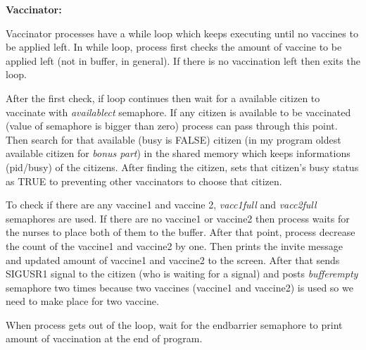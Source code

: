 \documentclass[12pt]{report}
\renewcommand{\_}{\kern-1.5pt\textunderscore\kern-1.5pt}
\begin{document}
\vspace{\baselineskip}
\begin{FlushLeft}
{\fontsize{14pt}{16.8pt}\selectfont \textbf{Vaccinator:}} 
\end{FlushLeft}
\begin{FlushLeft}
Vaccinator processes have a while loop which keeps executing until no vaccines to be applied left. In while loop, process first checks the amount of vaccine to be applied left (not in buffer, in general). If there is no vaccination left then exits the loop. 
\end{FlushLeft}
\begin{FlushLeft}
After the first check, if loop continues then wait for a available citizen to vaccinate with \textit{available\_ct }semaphore. If any citizen is available to be vaccinated (value of semaphore is bigger than zero) process can pass through this point. Then search for that available (busy is FALSE) citizen (in my program oldest available citizen for \textit{bonus part}) in the shared memory which keeps informations (pid/busy) of the citizens. After finding the citizen, sets that citizen’s busy status as TRUE to preventing other vaccinators to choose that citizen.
\end{FlushLeft}
\begin{FlushLeft}
To check if there are any vaccine1 and vaccine 2, \textit{vacc1\_full} and \textit{vacc2\_full} semaphores are used. If there are no vaccine1 or vaccine2 then process waits for the nurses to place both of them to the buffer. After that point, process decrease the count of the vaccine1 and vaccine2 by one. Then prints the invite message and updated amount of vaccine1 and vaccine2 to the screen. After that sends SIGUSR1 signal to the citizen (who is waiting for a signal) and posts\textit{ buffer\_empty} semaphore two times because two vaccines (vaccine1 and vaccine2) is used so we need to make place for two vaccine.
\end{FlushLeft}
\begin{FlushLeft}
When process gets out of the loop, wait for the end\_barrier semaphore to print amount of vaccination at the end of program.
\end{FlushLeft}
\end{document}
